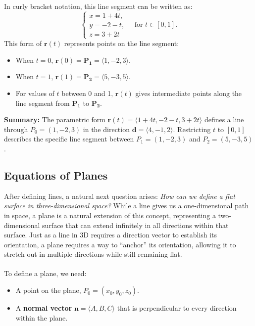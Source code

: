 \begin{example}
\begin{solution}
\begin{enumerate}
    \noindent In curly bracket notation, this line segment can be written as:
    \[
    \left\{
    \begin{array}{l}
        x = 1 + 4t, \\
        y = -2 - t, \\
        z = 3 + 2t
    \end{array}
    \right. \quad \text{for } t \in [0, 1].
    \]
    This form of \( \mathbf{r}(t) \) represents points on the line segment:
    \begin{itemize}
        \item When \( t = 0 \), \( \mathbf{r}(0) = \mathbf{P_1} = \langle 1, -2, 3 \rangle \).
        \item When \( t = 1 \), \( \mathbf{r}(1) = \mathbf{P_2} = \langle 5, -3, 5 \rangle \).
        \item For values of \( t \) between 0 and 1, \( \mathbf{r}(t) \) gives intermediate points along the line segment from \( \mathbf{P_1} \) to \( \mathbf{P_2} \).
    \end{itemize}
\end{enumerate}

\noindent \textbf{Summary:} The parametric form \( \mathbf{r}(t) = \langle 1 + 4t, -2 - t, 3 + 2t \rangle \) defines a line through \( P_0 = (1, -2, 3) \) in the direction \( \mathbf{d} = \langle 4, -1, 2 \rangle \). Restricting \( t \) to \( [0, 1] \) describes the specific line segment between \( P_1 = (1, -2, 3) \) and \( P_2 = (5, -3, 5) \).
\end{solution}
\end{example}
\exampleline





\subsection*{Equations of Planes}

\noindent After defining lines, a natural next question arises: \textit{How can we define a flat surface in three-dimensional space?} While a line gives us a one-dimensional path in space, a plane is a natural extension of this concept, representing a two-dimensional surface that can extend infinitely in all directions within that surface. Just as a line in 3D requires a direction vector to establish its orientation, a plane requires a way to “anchor” its orientation, allowing it to stretch out in multiple directions while still remaining flat. \\ \\ To define a plane, we need:
\begin{itemize}
    \item A point on the plane, \( P_0 = (x_0, y_0, z_0) \).
    \item A \textbf{normal vector} \( \mathbf{n} = \langle A, B, C \rangle \) that is perpendicular to every direction within the plane.
\end{itemize}

